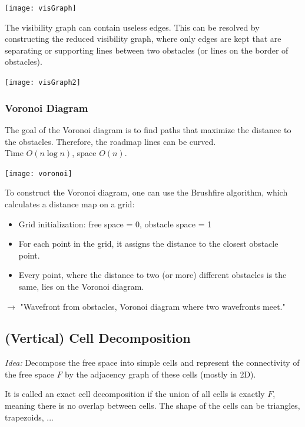 \begin{multicols*}{2}
\begin{center}
\texttt{[image: visGraph]}
\end{center}

\noindent The visibility graph can contain useless edges.
This can be resolved by constructing the reduced visibility graph, where only edges are kept that are separating or supporting lines between two obstacles (or lines on the border of obstacles). 

\begin{center}
\texttt{[image: visGraph2]}
\end{center}

\subsubsection{Voronoi Diagram}
The goal of the Voronoi diagram is to find paths that maximize the distance to the obstacles. Therefore, the roadmap lines can be curved.\\
Time $O(n \log n)$, space $O(n)$.

\begin{center}
\texttt{[image: voronoi]}
\end{center}

\noindent To construct the Voronoi diagram, one can use the Brushfire algorithm, which calculates a distance map on a grid:
\begin{itemize}
	\item Grid initialization: free space = 0, obstacle space = 1
	\item For each point in the grid, it assigns the distance to the closest obstacle point.
	\item Every point, where the distance to two (or more) different obstacles is the same, lies on the Voronoi diagram.
\end{itemize}
$\rightarrow$ "Wavefront from obstacles, Voronoi diagram where two wavefronts meet."\\

\subsection{(Vertical) Cell Decomposition}
\textit{Idea:} Decompose the free space into simple cells and represent the connectivity of the free space $F$ by the adjacency graph of these cells (mostly in 2D).\par

It is called an exact cell decomposition if the union of all cells is exactly $F$, meaning there is no overlap between cells.
The shape of the cells can be triangles, trapezoids, ...


\end{multicols*}
